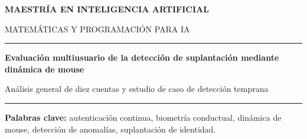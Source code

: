 \documentclass[11pt,letterpaper]{article}
\newcommand{\far}{\mathrm{FAR}}
\newcommand{\frr}{\mathrm{FRR}}
\newcommand{\auc}{\mathrm{AUC}}
\begin{document}
\begin{titlepage}
  \thispagestyle{empty}
  \centering
  {\large\bfseries MAESTRÍA EN INTELIGENCIA ARTIFICIAL\par}
  \vspace{0.35cm}
  {\large MATEMÁTICAS Y PROGRAMACIÓN PARA IA\par}
  \vspace{1.8cm}
  \rule{\textwidth}{1.1pt}\par
  \vspace{0.8cm}
  {\LARGE\bfseries
    Evaluación multiusuario de la detección de suplantación mediante dinámica de mouse\par
  }
  \vspace{0.55cm}
  {\large
    Análisis general de diez cuentas y estudio de caso de detección temprana\par
  }
  \vspace{0.8cm}
  \rule{\textwidth}{1.1pt}\par
  \vfill
\end{titlepage}

\begin{abstract}
Los controles de acceso tradicionales verifican credenciales en un instante, pero no garantizan que la persona
que continúa operando una sesión sea quien se autenticó. Este trabajo estudia la dinámica de mouse como una
biometría conductual para detectar cambios de operador mientras la sesión permanece activa. Se construyen perfiles
independientes para las diez cuentas del conjunto Balabit y se evalúan 816 sesiones públicas: 411 legítimas y 405
impostoras. Cada sesión se resume mediante 17 características temporales, espaciales y cinemáticas. Un baseline
RMS-z y un \emph{Isolation Forest} se entrenan solo con sesiones legítimas y usan un umbral propio por cuenta. En el
promedio general de las diez cuentas, RMS-z obtuvo $\auc=0.627$ e \emph{Isolation Forest} $\auc=0.611$; este último alcanzó
$\far=34.2\%$ y $\frr=61.0\%$, lo que revela separación modesta e inestabilidad entre usuarios. Como análisis
específico, \texttt{user12} se estudia con prefijos de 25 a 150 eventos. Su mejor AUC apareció con 100 eventos
($\auc=0.692$, $\far=69.4\%$ y $\frr=3.6\%$), pero ningún tamaño satisfizo el criterio operativo previo. Los
resultados muestran una señal conductual medible, aunque insuficiente para un autenticador autónomo.
\end{abstract}

\textbf{Palabras clave:} autenticación continua, biometría conductual, dinámica de mouse, detección de anomalías,
suplantación de identidad.
\end{document}
